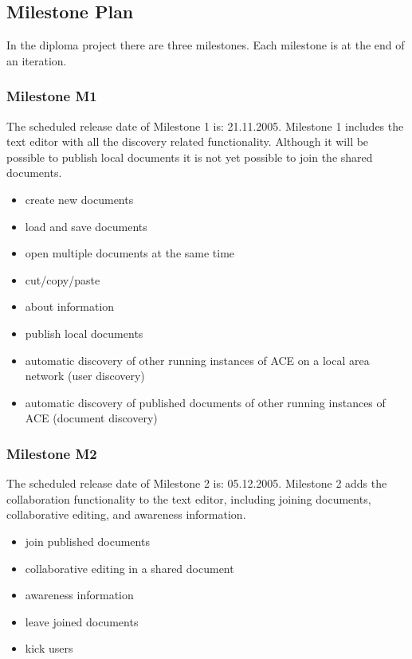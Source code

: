 \documentclass[11pt,a4paper]{article}
\begin{document}
\subsection{Milestone Plan}
\label{sect:Milestone Plan}

In the diploma project there are three milestones. Each milestone is at the end of an iteration.

\subsubsection{Milestone M1}

The scheduled release date of Milestone 1 is: 21.11.2005. Milestone 1 includes the text editor with
all the discovery related functionality. Although it will be possible to publish local documents
it is not yet possible to join the shared documents.

\begin{itemize}
 \item create new documents
 \item load and save documents
 \item open multiple documents at the same time
 \item cut/copy/paste
 \item about information
 \item publish local documents
 \item automatic discovery of other running instances of ACE on a local area network (user discovery)
 \item automatic discovery of published documents of other running instances of ACE (document discovery)
\end{itemize}

\subsubsection{Milestone M2}

The scheduled release date of Milestone 2 is: 05.12.2005. Milestone 2 adds the collaboration functionality
to the text editor, including joining documents, collaborative editing, and awareness information.

\begin{itemize}
 \item join published documents
 \item collaborative editing in a shared document
 \item awareness information
 \item leave joined documents
 \item kick users
\end{itemize}
\end{document}
